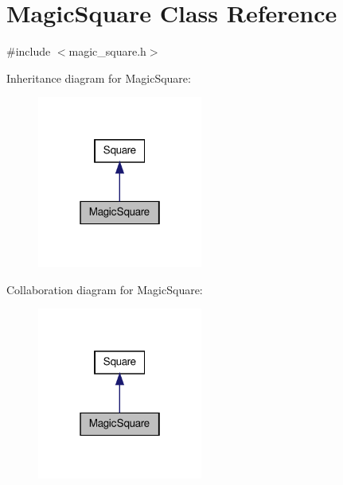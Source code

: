 \hypertarget{classMagicSquare}{\section{Magic\-Square Class Reference}
\label{classMagicSquare}
}


{\ttfamily \#include $<$magic\-\_\-square.\-h$>$}



Inheritance diagram for Magic\-Square\-:\nopagebreak
\begin{figure}[H]
\begin{center}
\leavevmode
\includegraphics[width=154pt]{classMagicSquare__inherit__graph}
\end{center}
\end{figure}


Collaboration diagram for Magic\-Square\-:\nopagebreak
\begin{figure}[H]
\begin{center}
\leavevmode
\includegraphics[width=154pt]{classMagicSquare__coll__graph}
\end{center}
\end{figure}
